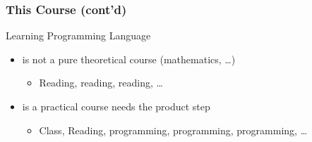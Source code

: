 \documentclass{../c-lecture}
\begin{document}
\begin{frame}
  \frametitle{This Course (cont'd)}
  Learning Programming Language

  \begin{itemize}
    \item is not a pure theoretical course (mathematics, \ldots)
    \begin{itemize}
      \item Reading, reading, reading, \ldots
    \end{itemize}
    \item is a practical course needs the product step
    \begin{itemize}
      \item Class, Reading, programming, programming, programming, \ldots
    \end{itemize}
  \end{itemize}
\end{frame}
\end{document}
